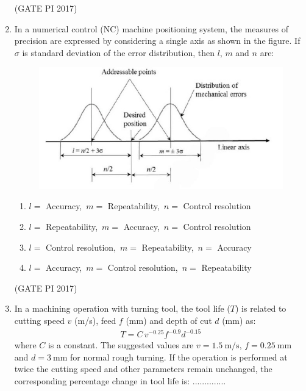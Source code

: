 \documentclass[journal,12pt,onecolumn]{IEEEtran}
\theoremstyle{remark}
\begin{document}
\begin{enumerate}
\begin{enumerate}
\end{enumerate}
\hfill (GATE PI 2017)

\item In a numerical control (NC) machine positioning system, the measures of precision are expressed by considering a single axis as shown in the figure.  
If $\sigma$ is standard deviation of the error distribution, then  $l$, $m$ and $n$ are:

\begin{figure}[h]
    \centering
    \includegraphics[width=0.5\columnwidth]{fig11.png}
    \caption{}
    \label{fig:placeholder}
\end{figure}

\begin{enumerate}
\item $l=$ Accuracy,\ $m=$ Repeatability,\ $n=$ Control resolution
\item $l=$ Repeatability,\ $m=$ Accuracy,\ $n=$ Control resolution
\item $l=$ Control resolution,\ $m=$ Repeatability,\ $n=$ Accuracy
\item $l=$ Accuracy,\ $m=$ Control resolution,\ $n=$ Repeatability
\end{enumerate}
\hfill (GATE PI 2017)

\item In a machining operation with turning tool, the tool life ($T$) is related to cutting speed $v$ (m/s), feed $f$ (mm) and depth of cut $d$ (mm) as:  
\begin{align*}
T = C\, v^{-0.25} f^{-0.9} d^{-0.15}
\end{align*}
where $C$ is a constant. The suggested values are $v = 1.5 \ \text{m/s}$, $f = 0.25 \ \text{mm}$ and $d = 3 \ \text{mm}$ for normal rough turning.  
If the operation is performed at twice the cutting speed and other parameters remain unchanged,  
the corresponding percentage change in tool life is:  
..............


\end{enumerate}
\end{document}
